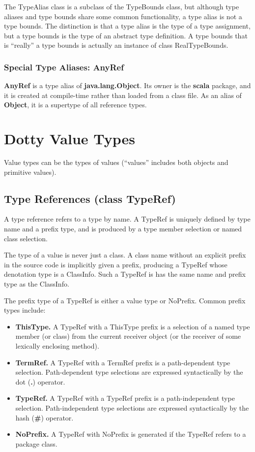 \documentclass[11pt]{report}
\newcommand{\cdf}{\bf\ttfamily} %
\newcommand{\cd}{\cdf\small}  %
\begin{document}
The TypeAlias class is a subclass of the TypeBounds class, but although type aliases and type bounds share some common functionality, a type alias is not a type bounds. The distinction is that a type alias is the type of a type assignment, but a type bounds is the type of an abstract type definition. A type bounds that is ``really'' a type bounds is actually an instance of class RealTypeBounds.

\subsubsection{Special Type Aliases: AnyRef}

{\cd AnyRef} is a type alias of {\cd java.lang.Object}. Its owner is the {\cd scala} package, and it is created at compile-time rather than loaded from a class file. As an alias of {\cd Object}, it is a supertype of all reference types.


\section{Dotty Value Types} \label{sec:value-types}

Value types can be the types of values (``values'' includes both objects and primitive values).

\subsection{Type References (class TypeRef)}

A type reference refers to a type by name.
A TypeRef is uniquely defined by type name and a prefix type, and is produced by a type member selection or named class selection.

The type of a value is never just a class. A class name without an explicit prefix in the source code is implicitly given a prefix, producing a TypeRef whose denotation type is a ClassInfo. Such a TypeRef is has the same name and prefix type as the ClassInfo.

The prefix type of a TypeRef is either a value type or NoPrefix. Common prefix types include:
\begin{itemize}
\item {\bf ThisType.} A TypeRef with a ThisType prefix is a selection of a named type member (or class) from the current receiver object (or the receiver of some lexically enclosing method).
\item {\bf TermRef.} A TypeRef with a TermRef prefix is a path-dependent type selection. Path-dependent type selections are expressed syntactically by the dot ({\cd .}) operator.
\item {\bf TypeRef.} A TypeRef with a TypeRef prefix is a path-independent type selection. Path-independent type selections are expressed syntactically by the hash ({\cd \#}) operator.
\item {\bf NoPrefix.} A TypeRef with NoPrefix is generated if the TypeRef refers to a package class.
\end{itemize}
\end{document}
